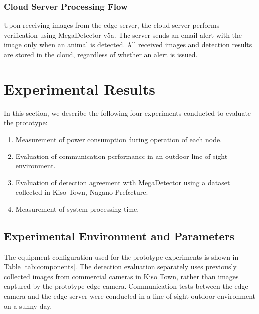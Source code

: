 \documentclass[conference]{IEEEtran}
\begin{document}
\subsubsection{Cloud Server Processing Flow}
Upon receiving images from the edge server, the cloud server performs verification using MegaDetector v5a. The server sends an email alert with the image only when an animal is detected. All received images and detection results are stored in the cloud, regardless of whether an alert is issued.

\section{Experimental Results}
In this section, we describe the following four experiments conducted to evaluate the prototype:
\begin{enumerate}
    \item Measurement of power consumption during operation of each node.
    \item Evaluation of communication performance in an outdoor line-of-sight environment.
    \item Evaluation of detection agreement with MegaDetector using a dataset collected in Kiso Town, Nagano Prefecture.
    \item Measurement of system processing time.
\end{enumerate}

\subsection{Experimental Environment and Parameters}
The equipment configuration used for the prototype experiments is shown in Table \ref{tab:components}. The detection evaluation separately uses previously collected images from commercial cameras in Kiso Town, rather than images captured by the prototype edge camera. Communication tests between the edge camera and the edge server were conducted in a line-of-sight outdoor environment on a sunny day.
\end{document}
